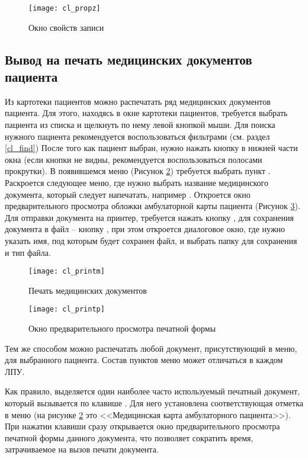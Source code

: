\begin{figure}[ht]\centering
 \texttt{[image: cl\_propz]}
 \caption{Окно свойств записи}
 \label{img_cl_propz}
\end{figure} 

\subsection{Вывод на печать медицинских документов пациента}

Из картотеки пациентов можно распечатать ряд медицинских документов пациента. Для этого, находясь в окне картотеки пациентов, требуется выбрать пациента из списка и щелкнуть по нему левой кнопкой мыши. Для поиска нужного пациента рекомендуется воспользоваться фильтрами (см. раздел \ref{cl_find}) После того как пациент выбран, нужно нажать кнопку  в нижней части окна (если кнопки не видны, рекомендуется воспользоваться полосами прокрутки). В появившемся меню (Рисунок \ref{img_cl_printm}) требуется выбрать пункт . Раскроется следующее меню, где нужно выбрать название медицинского документа, который следует напечатать, например . Откроется окно предварительного просмотра обложки амбулаторной карты пациента (Рисунок \ref{img_cl_printing}). Для отправки документа на принтер, требуется нажать кнопку  , для сохранения документа в файл – кнопку  , при этом откроется диалоговое окно, где нужно указать имя, под которым будет сохранен файл, и выбрать папку для сохранения и тип файла.

\begin{figure}[ht]\centering
 \texttt{[image: cl\_printm]}
 \caption{Печать медицинских документов}
 \label{img_cl_printm}
\end{figure} 

\begin{figure}[ht]\centering
 \texttt{[image: cl\_printp]}
 \caption{Окно предварительного просмотра печатной формы}
 \label{img_cl_printing}
\end{figure} 

Тем же способом можно распечатать любой документ, присутствующий в меню, для выбранного пациента. Состав пунктов меню может отличаться в каждом ЛПУ.

Как правило, выделяется один наиболее часто используемый печатный документ, который вызывается по клавише . Для него установлена соответствующая отметка в меню (на рисунке \ref{img_cl_printm} это <<Медицинская карта амбулаторного пациента>>). При нажатии клавиши  сразу открывается окно предварительного просмотра печатной формы данного документа, что позволяет сократить время, затрачиваемое на вызов печати документа.

